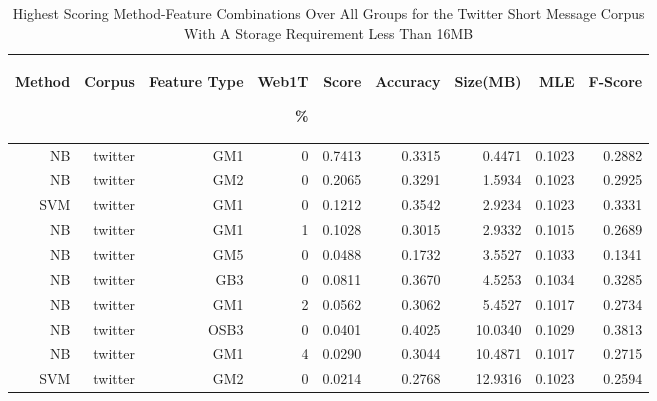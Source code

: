 \begin{table}[htbp!]
	\begin{center}
		\begin{tabular}{ | r | r | r | r | r | r | r | r| r | }
			\hline
			\begin{sideways}Method\end{sideways} & \begin{sideways}Corpus\end{sideways} & \begin{sideways}Feature Type\end{sideways} & \begin{sideways}Web1T\end{sideways} \% & \begin{sideways}Score\end{sideways} & \begin{sideways}Accuracy\end{sideways} & \begin{sideways}Size(MB)\end{sideways} &\begin{sideways}MLE\end{sideways} & \begin{sideways}F-Score\end{sideways}\\ \hline

			NB	& twitter	& GM1	& 0	& 0.7413	& 0.3315	& 0.4471	& 0.1023	& 0.2882\\ \hline 
			NB	& twitter	& GM2	& 0	& 0.2065	& 0.3291	& 1.5934	& 0.1023	& 0.2925\\ \hline 
			SVM	& twitter	& GM1	& 0	& 0.1212	& 0.3542	& 2.9234	& 0.1023	& 0.3331\\ \hline 
			NB	& twitter	& GM1	& 1	& 0.1028	& 0.3015	& 2.9332	& 0.1015	& 0.2689\\ \hline 
			NB	& twitter	& GM5	& 0	& 0.0488	& 0.1732	& 3.5527	& 0.1033	& 0.1341\\ \hline 
			NB	& twitter	& GB3	& 0	& 0.0811	& 0.3670	& 4.5253	& 0.1034	& 0.3285\\ \hline 
			NB	& twitter	& GM1	& 2	& 0.0562	& 0.3062	& 5.4527	& 0.1017	& 0.2734\\ \hline 
			NB	& twitter	& OSB3	& 0	& 0.0401	& 0.4025	& 10.0340	& 0.1029	& 0.3813\\ \hline 
			NB	& twitter	& GM1	& 4	& 0.0290	& 0.3044	& 10.4871	& 0.1017	& 0.2715\\ \hline 
			SVM	& twitter	& GM2	& 0	& 0.0214	& 0.2768	& 12.9316	& 0.1023	& 0.2594\\ \hline 

\end{tabular}
		\caption{Highest Scoring Method-Feature Combinations Over All Groups for the Twitter Short Message Corpus With A Storage Requirement Less Than 16MB}
		\label{tab:top_twitter_by_score_all_groups_under_16mb}
	\end{center}
\end{table}

